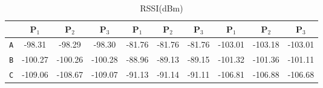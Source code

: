 \begin{table}
\begin{subtable}{\textwidth}
\begin{center}
\begin{tabular}{|c|c|c|c|c|c|c|c|c|c|}
                                   & \textbf{P$_1$}                        & \textbf{P$_2$}                          & \textbf{P$_3$}                         & \textbf{P$_1$} & \textbf{P$_2$} & \textbf{P$_3$} & \textbf{P$_1$} & \textbf{P$_2$} & \textbf{P$_3$} \\ \hline
                        \texttt{A} & -98.31                                & -98.29                                  & -98.30                                 & -81.76         & -81.76         & -81.76         & -103.01        & -103.18        & -103.01        \\ \hline
                        \texttt{B} & -100.27                               & -100.26                                 & -100.28                                & -88.96         & -89.13         & -89.15         & -101.32        & -101.36        & -101.11        \\ \hline
                        \texttt{C} & -109.06                               & -108.67                                 & -109.07                                & -91.13         & -91.14         & -91.11         & -106.81        & -106.88        & -106.68        \\ \hline
                  \end{tabular}
                  \caption{RSSI(dBm)}
                  \label{table:rssi2}
            \end{center}
      \end{subtable}%
      \label{tab:table1}
\end{table}

